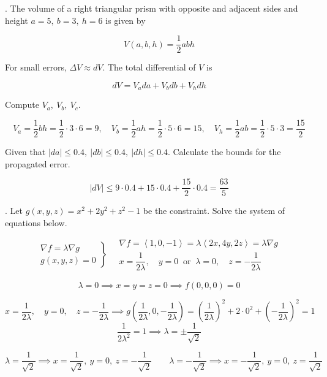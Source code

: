\documentclass{article}
\begin{document}
\hfill

. The volume of a right triangular prism with opposite and adjacent sides and height $a=5,\:b=3,\:h=6$ is given by

\[V(a,b,h)=\frac12 abh\]

\hfill

\noindent For small errors, $\Delta V\approx dV$. The total differential of $V$ is

\[dV=V_ada+V_bdb+V_hdh\]

\hfill

\noindent Compute $V_a,\: V_b,\: V_c$.

\[V_a=\frac12bh=\frac12\cdot3\cdot6=9,\quad V_b=\frac12ah=\frac12\cdot5\cdot6=15,\quad V_h=\frac12ab=\frac12\cdot5\cdot3=\frac{15}2\]

\hfill

\noindent Given that $|da|\leq0.4,\:|db|\leq0.4,\:|dh|\leq0.4$. Calculate the bounds for the propagated error.

\[\left|dV\right|\leq9\cdot0.4+15\cdot0.4+\frac{15}2\cdot0.4=\boxed{\frac{63}5}\]

\hfill

. Let $g(x,y,z)=x^2+2y^2+z^2-1$ be the constraint. Solve the system of equations below.

\[
\left.
\begin{array}{c}
\displaystyle\nabla f=\lambda\nabla g\\
\displaystyle g(x,y,z)=0
\end{array}
\right\}\quad
\begin{array}{l}
\nabla f=\left\langle1,0,-1\right\rangle=\lambda\left\langle2x,4y,2z\right\rangle=\lambda\nabla g\\[1em]x=\dfrac1{2\lambda},\quad y=0\:\text{ or }\:\lambda=0,\quad z=-\dfrac1{2\lambda}
\end{array}
\]

\hfill

\[\lambda=0\implies x=y=z=0\implies f(0,0,0)=0\]

\[x=\frac1{2\lambda},\quad y=0,\quad z=-\frac1{2\lambda}\implies g\left(\frac1{2\lambda},0,-\frac1{2\lambda}\right)=\left(\frac1{2\lambda}\right)^2+2\cdot0^2+\left(-\frac1{2\lambda}\right)^2=1\]
\[\frac1{2\lambda^2}=1\implies\lambda=\pm\frac1{\sqrt2}\]

\hfill

\[\lambda=\frac1{\sqrt2}\implies x=\frac1{\sqrt2},\: y=0,\: z=-\frac1{\sqrt2}\qquad\lambda=-\frac1{\sqrt2}\implies x=-\frac1{\sqrt2},\: y=0,\: z=\frac1{\sqrt2}\]
\end{document}
